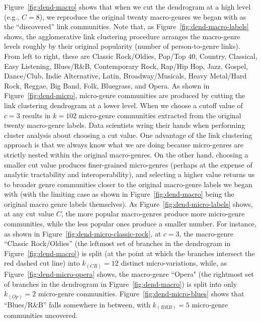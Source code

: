 \documentclass[a4paper,12pt]{extarticle}
\begin{document}
Figure~\ref{fig:dend-macro} shows that when we cut the dendrogram at a high level (e.g., $C = 8$), we reproduce the original twenty macro-genres we began with as the ``discovered'' link communities. Note that, as Figure~\ref{fig:dend-macro-labels} shows, the agglomerative link clustering procedure arranges the macro-genre levels roughly by their original popularity (number of person-to-genre links). From left to right, these are Classic Rock/Oldies, Pop/Top 40, Country, Classical, Easy Listening, Blues/R\&B, Contemporary Rock, Rap/Hip Hop, Jazz, Gospel, Dance/Club, Indie Alternative, Latin, Broadway/Musicals, Heavy Metal/Hard Rock, Reggae, Big Band, Folk, Bluegrass, and Opera. As shown in Figure~\ref{fig:dend-micro}, micro-genre communities are produced by cutting the link clustering dendrogram at a lower level. When we choose a cutoff value of $c = 3$ results in $k = 102$ micro-genre communities extracted from the original twenty macro-genre labels. Data scientists wring their hands when performing cluster analysis about choosing a cut value. One advantage of the link clustering approach is that we always know what we are doing because micro-genres are strictly nested within the original macro-genres. On the other hand, choosing a smaller cut value produces finer-grained micro-genres (perhaps at the expense of analytic tractability and interoperability), and selecting a higher value returns us to broader genre communities closer to the original macro-genre labels we began with (with the limiting case as shown in Figure~\ref{fig:dend-macro} being the original macro genre labels themselves). As Figure~\ref{fig:dend-micro-labels} shows, at any cut value $C$, the more popular macro-genres produce more micro-genre communities, while the less popular ones produce a smaller number. For instance, as shown in Figure~\ref{fig:dend-micro-classic-rock}, at $c = 3$, the macro-genre ``Classic Rock/Oldies'' (the leftmost set of branches in the dendrogram in Figure~\ref{fig:dend-macro}) is split (at the point at which the branches intersect the red dashed cut line) into $k_{(CR)} = 12$ distinct micro-variations, while, as Figure~\ref{fig:dend-micro-opera} shows, the macro-genre ``Opera" (the rightmost set of branches in the dendrogram in Figure~\ref{fig:dend-macro}) is split into only $k_{(Op)} = 2$  micro-genre communities. Figure~\ref{fig:dend-micro-blues} shows that ``Blues/R\&B'' falls somewhere in between, with $k_{(BRB)} = 5$  micro-genre communities uncovered.
\end{document}
